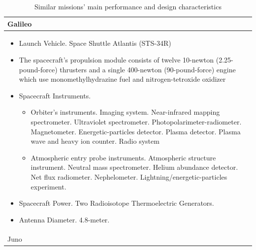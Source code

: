 \begin{longtable}{p{}}
  \caption{Similar missions' main performance and design
    characteristics} \\ \toprule

  Galileo \\* \midrule

  \begin{itemize}
  \item Launch Vehicle. Space Shuttle Atlantis (STS-34R)
  \item The spacecraft's propulsion module consists of twelve
    10-newton (2.25-pound-force) thrusters and a single 400-newton
    (90-pound-force) engine which use monomethylhydrazine fuel and
    nitrogen-tetroxide oxidizer
  \item Spacecraft Instruments.
    \begin{itemize}
    \item Orbiter's instruments.
      Imaging system.
      Near-inf\-ra\-red mapping spectrometer.
      Ultraviolet spectrometer.
      Pho\-to\-po\-la\-ri\-me\-ter-radiometer.
      Magnetometer.
      E\-ner\-ge\-tic-par\-tic\-les detector.
      Plasma detector.
      Plasma wave and heavy ion counter. Radio system
    \item Atmospheric entry probe instruments. Atmospheric structure
      instrument.  Neutral mass spectrometer. Helium abundance
      detector. Net flux
      radiometer. Nephelometer. Lightning/energetic-particles
      experiment.
    \end{itemize}
  \item Spacecraft Power. Two Radioisotope Thermoelectric Generators.
  \item Antenna Diameter. 4.8-meter.
  \end{itemize} \\

  Juno \\* \midrule


\end{longtable}
